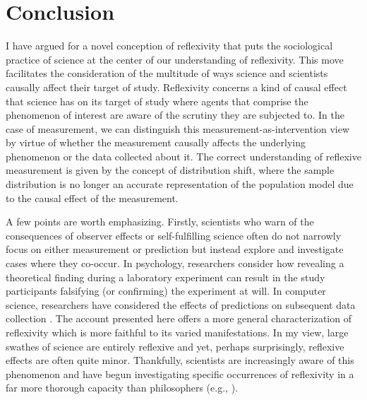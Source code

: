 \section{Conclusion}\label{sec_conc}

I have argued for a novel conception of reflexivity that puts the sociological practice of science at the center of our understanding of reflexivity. This move facilitates the consideration of the multitude of ways science and scientists causally affect their target of study. Reflexivity concerns a kind of causal effect that science has on its target of study where agents that comprise the phenomenon of interest are aware of the scrutiny they are subjected to. In the case of measurement, we can distinguish this measurement-as-intervention view by virtue of whether the measurement causally affects the underlying phenomenon or the data collected about it. The correct understanding of reflexive measurement is given by the concept of distribution shift, where the sample distribution is no longer an accurate representation of the population model due to the causal effect of the measurement.

A few points are worth emphasizing. Firstly, scientists who warn of the consequences of observer effects or self-fulfilling science often do not narrowly focus on either measurement or prediction but instead explore and investigate cases where they co-occur. In psychology, researchers \autocite{gergen1973,luce95} consider how revealing a theoretical finding during a laboratory experiment can result in the study participants falsifying (or confirming) the experiment at will. In computer science, researchers have considered the effects of predictions on subsequent data collection \autocite{perdomo2020}. The account presented here offers a more general characterization of reflexivity which is more faithful to its varied manifestations. In my view, large swathes of science are entirely reflexive and yet, perhaps surprisingly, reflexive effects are often quite minor. Thankfully, scientists are increasingly aware of this phenomenon and have begun investigating specific occurrences of reflexivity in a far more thorough capacity than philosophers (e.g., \cite{rothschild2014,westwood2020}).


